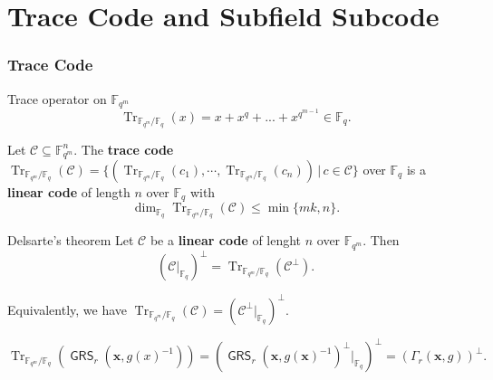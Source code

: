 \documentclass[
10pt, %
%
aspectratio=169, %
]{beamer}
\theoremstyle{plain}%
\theoremstyle{definition}
\theoremstyle{remark}
\newcommand{\calC}{\mathcal{C}}
\newcommand{\fqm}{\mathbb{F}_{q^m}}
\newcommand{\fq}{\mathbb{F}_{q}}
\newcommand{\Tr}[1]{\operatorname{Tr}_{\mathbb{F}_{q^m}/\fq}\left(#1\right)}
\newcommand{\GRS}{\operatorname{\mathsf{GRS}}}
\begin{document}
\section{Trace Code and Subfield Subcode}
\begin{frame}
	\frametitle{Trace Code}
	\begin{block}{Trace operator on $\mathbb{F}_{q^m}$}
		\[\Tr{x} = x + x^q + ... + x^{q^{m-1}} \in \fq.\]
	\end{block}

Let $\calC \subseteq \fqm^n$. The \textbf{trace code} $\Tr{\calC}=\{(\Tr{c_1},\cdots,\Tr{c_n})\,|\, c\in \calC\}$ over $\fq$ is a \textbf{linear code} of length $n$ over $\fq$ with
\[\dim_{\mathbb{F}_q} \Tr{\calC} \leq \min\{mk,n\}.\]	
\vspace{-1.2em}
\begin{block}{Delsarte's theorem}
	Let $\calC$ be a \textbf{linear code} of lenght $n$ over $\fqm$. Then
	\[\left(\calC|_{\fq}\right)^{\perp} = \Tr{\calC^{\perp}}.\]
\end{block}
Equivalently, we have $\Tr{\calC}= \left(\calC^{\perp}|_{\fq}\right)^{\perp}$.
\vspace{-0.5em}
\begin{tcolorbox}[colback=gold]
	\[\Tr{\GRS_r(\mathbf{x},g(x)^{-1})} =( \GRS_r(\mathbf{x},g(\mathbf{x})^{-1})^\perp|_{\fq})^\perp= (\Gamma_r(\mathbf{x},g))^{\perp}.\]
\end{tcolorbox}
\end{frame}
\end{document}
